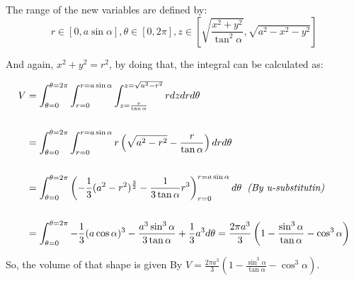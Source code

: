 \documentclass[12pt]{article}
\begin{document}
\vspace*{0.3cm}
The range of the new variables are defined by:
\[ r \in \left[ 0,a\sin{\alpha} \right] ,
\theta \in \left[ 0 , 2\pi \right],
z \in \left[ \displaystyle{
\sqrt{\frac{x^2 + y^2}{\tan^2 \alpha}},
\sqrt{a^2-x^2-y^2}} \right]\]

And again, $x^2 + y^2 = r^2$, by doing that, the integral
can be calculated as:

\begin{align*}
 V &= \int_{\theta = 0}^{\theta = 2\pi}
\int_{r=0}^{r=a\sin \alpha} \int_{z = 
\frac{r}{\tan \alpha}}^{z = \sqrt{a^2-r^2}} r
dzdrd\theta\\
&\\
&=\int_{\theta = 0}^{\theta = 2\pi}
\int_{r=0}^{r=a\sin \alpha}
r \left( \sqrt{a^2-r^2} - \displaystyle{\frac{r}{\tan \alpha}} \right) drd\theta\\
&\\
&=\int_{\theta = 0}^{\theta = 2\pi} \displaystyle{
\left( -\frac{1}{3}(a^2-r^2)^{\frac{3}{2}}-
\frac{1}{3\tan \alpha}r^3 \right)_{r = 0}^{r = a\sin \alpha} d \theta
\hspace*{0.2cm} \textit{(By u-substitutin)}
} \\
&\\
&=\int_{\theta = 0}^{\theta = 2\pi} \displaystyle{
-\frac{1}{3}(a\cos\alpha)^3 - \frac{a^3\sin^3\alpha}{3\tan \alpha}
+\frac{1}{3}a^3 d\theta
}
= \displaystyle{\frac{2\pi a^3}{3}\left(
    1 - \frac{\sin^3 \alpha}{\tan \alpha} - \cos^3 \alpha
\right)}
\end{align*}

So, the volume of that shape is given By
$V=\displaystyle{\frac{2\pi a^3}{3}\left(
    1 - \frac{\sin^3 \alpha}{\tan \alpha} - \cos^3 \alpha
\right)}$.
\end{document}
